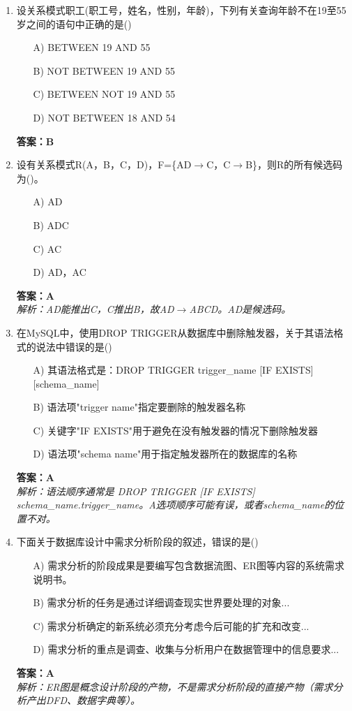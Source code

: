 \documentclass[a4paper,12pt]{article}
\begin{document}
\begin{enumerate}[label=\arabic*.]
\item 设关系模式职工(职工号，姓名，性别，年龄)，下列有关查询年龄不在19至55岁之间的语句中正确的是()
\begin{itemize}
    \item[A)] BETWEEN 19 AND 55
    \item[B)] NOT BETWEEN 19 AND 55
    \item[C)] BETWEEN NOT 19 AND 55
    \item[D)] NOT BETWEEN 18 AND 54
\end{itemize}
\textbf{答案：B}

\item 设有关系模式R(A，B，C，D)，F=\{AD$\to$C，C$\to$B\}，则R的所有候选码为()。
\begin{itemize}
    \item[A)] AD
    \item[B)] ADC
    \item[C)] AC
    \item[D)] AD，AC
\end{itemize}
\textbf{答案：A} \\
\textit{解析：AD能推出C，C推出B，故AD$\to$ABCD。AD是候选码。}

\item 在MySQL中，使用DROP TRIGGER从数据库中删除触发器，关于其语法格式的说法中错误的是()
\begin{itemize}
    \item[A)] 其语法格式是：DROP TRIGGER trigger\_name [IF EXISTS][schema\_name]
    \item[B)] 语法项"trigger name"指定要删除的触发器名称
    \item[C)] 关键字"IF EXISTS"用于避免在没有触发器的情况下删除触发器
    \item[D)] 语法项"schema name"用于指定触发器所在的数据库的名称
\end{itemize}
\textbf{答案：A} \\
\textit{解析：语法顺序通常是 DROP TRIGGER [IF EXISTS] schema\_name.trigger\_name。A选项顺序可能有误，或者schema\_name的位置不对。}

\item 下面关于数据库设计中需求分析阶段的叙述，错误的是()
\begin{itemize}
    \item[A)] 需求分析的阶段成果是要编写包含数据流图、ER图等内容的系统需求说明书。
    \item[B)] 需求分析的任务是通过详细调查现实世界要处理的对象...
    \item[C)] 需求分析确定的新系统必须充分考虑今后可能的扩充和改变...
    \item[D)] 需求分析的重点是调查、收集与分析用户在数据管理中的信息要求...
\end{itemize}
\textbf{答案：A} \\
\textit{解析：ER图是概念设计阶段的产物，不是需求分析阶段的直接产物（需求分析产出DFD、数据字典等）。}


\end{enumerate}
\end{document}
